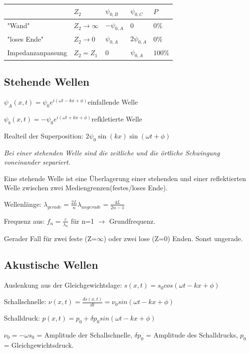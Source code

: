 \documentclass[10pt,a4paper]{scrartcl}
\begin{document}
\begin{multicols*}{3}
	\begin{tabular*}{\linewidth}{l|l|l|l|l}
	\hline
	&$Z_2$&$\psi_{0,B}$&$\psi_{0,C}$&$P$\\
	\hline
	"Wand" &$Z_2\rightarrow\infty$ & $-\psi_{0,A}$ & 0 & $0\%$\\
	"loses Ende"&$Z_2\rightarrow 0$&$\psi_{0,A}$&$2\psi_{0,A}$&$0\%$\\
	Impedanzanpassung&$Z_2 = Z_1$&0&$\psi_{0,A}$&$100\%$\\
	\hline
	\end{tabular*}	
	
	\subsection{Stehende Wellen}
	
	$\psi_A(x,t)=\psi_0e^{i(\omega t -kx+\phi)}$\hfill einfallende Welle
	
	$\psi_b(x,t)=-\psi_0e^{i(\omega t+kx+\phi)}$\hfill refkletierte Welle
	
	Realteil der Superposition: $2\psi_0\sin(kx)\sin(\omega t+\phi)$
	
	\emph{Bei einer stehenden Welle sind die zeitliche und die örtliche Schwingung voneinander separiert.}
	
	\finn
	
	Eine stehende Welle ist eine Überlagerung einer stehenden und einer reflektierten Welle zwischen zwei Mediengrenzen(festes/loses Ende).
	
	Wellenlänge: $\lambda_{gerade}=\frac{2L}{n}$\hfill$\lambda_{ungerade}=\frac{4L}{2n-1}$
	
	Frequenz aus: $f_n=\frac{c}{\lambda_n}$ für n=1 $\rightarrow$ Grundfrequenz.
		
	Gerader Fall für zwei feste (Z=$\infty$) oder zwei lose (Z=0) Enden. Sonst ungerade.
	
	
	\subsection{Akustische Wellen}
	
	Auslenkung aus der Gleichgewichtslage: $s(x,t)=s_0cos(\omega t-kx+\phi)$ 
	
	Schallschnelle: $\nu(x,t)=\frac{ds(x,t)}{dt}=\nu_0sin(\omega t -kx + \phi)$ 
	
	Schalldruck: $p(x,t)=p_0+\delta p_0 sin(\omega t-kx+\phi)$ 
	
	$\nu_0 = -\omega s_0$ = Amplitude der Schallschnelle, $\delta p_0$ = Amplitude des Schalldrucks, $p_0$ = Gleichgewichtsdruck.
	

\end{multicols*}
\end{document}
